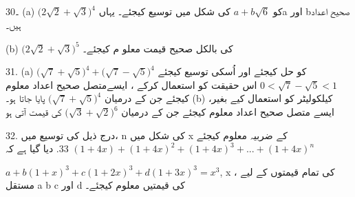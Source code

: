 30۔  (a)
 \( {(2\sqrt{2}+\sqrt{3}})^{4}\)
کو
 \( a+b\sqrt{6}\)
کی شکل میں توسیع کیجئے۔ یہاںa اور bصحیح اعداد ہیں۔
 
(b)
  \( {(2\sqrt{2}+\sqrt{3}})^{5}\)
کی بالکل صحیح قیمت معلو م کیجئے۔ 

31.
(a)
   \({(\sqrt{7}+\sqrt{5}})^{4}+ {(\sqrt{7}-\sqrt{5}})^{4}\)
کو حل کیجئے اور اُسکی توسیع کیجئے
   \( 0<\sqrt{7}-\sqrt{5}<1\)
اس حقیقت کو استعمال کرکے ، ایسےمتصل صحیح اعداد معلوم کیجئے جن کے درمیان 
    \({(\sqrt{7}+\sqrt{5}})^{4}\)
پایا جاتا ہو۔ 
(b)
کیلکولیٹر کو استعمال کیے بغیر،   ایسے متصل  صحیح اعداد معلوم کیجئے جن کے درمیان 
\( {(\sqrt{3}+\sqrt{2}})^{6}\)
کی قیمت آتی ہو

32.
درج ذیل کی توسیع میں، n  کی شکل میں      x  کے ضربیہ معلوم کیجئے
\({(1+4x)}+{(1+4x)^{2}}+{(1+4x)^{3}}+...+{(1+4x)^{n}}\)
33.
دیا گیا ہے کہ 

\( {a}+{b(1+x)^{3}}+{c(1+2x)^{3}}+{d(1+3x)^{3}}={x}^{3}\), 
x
 کی تمام قیمتوں کے لیے ،  مستقل a   b c            اور       d  کی قیمتیں معلوم کیجئے۔
